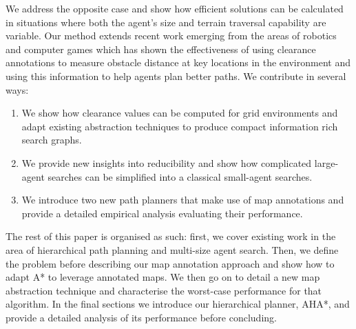 We address the opposite case and show how efficient solutions can be calculated in situations where both the agent's size and terrain traversal capability are variable. Our method extends recent work emerging from the areas of robotics and computer games which has shown the effectiveness of using clearance annotations to measure obstacle distance at key locations in the environment and using this information to help agents plan better paths. We contribute in several ways:
\begin{enumerate}
\item{We show how clearance values can be computed for grid environments and adapt existing abstraction techniques to produce compact information rich search graphs.}
\item{We provide new insights into reducibility and show how complicated large-agent searches can be simplified into a classical small-agent searches.}
\item{We introduce two new path planners that make use of map annotations and provide a detailed empirical analysis evaluating their performance. }
\end{enumerate} 

The rest of this paper is organised as such: first, we cover existing work in the area of hierarchical path planning and multi-size agent search. Then, we define the problem before describing our map annotation approach and show how to adapt A* to leverage annotated maps. We then go on to detail a new map abstraction technique and characterise the worst-case performance for that algorithm. In the final sections we introduce our hierarchical planner, AHA*, and provide a detailed analysis of its performance before concluding.
